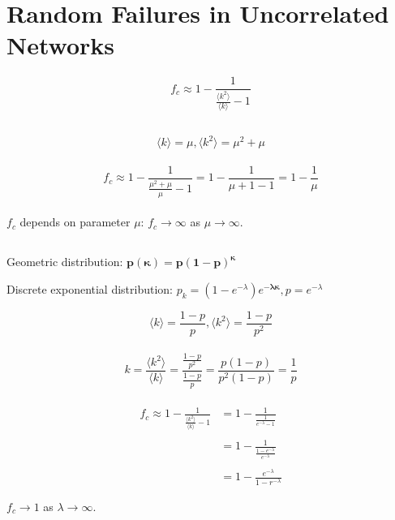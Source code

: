 \documentclass[../document.tex]{subfiles}
\begin{document}
\section{Random Failures in Uncorrelated Networks}

$$ f_c \approx 1 - \frac{ 1 }{ \frac{ \langle k^2 \rangle }{ \langle k \rangle } - 1 } $$

\subsection{}

$$ \langle k \rangle = \mu, \langle k^2 \rangle = \mu^2 + \mu $$ \\

$$ f_c \approx 1 - \frac{ 1 }{ \frac{ \mu^2 + \mu }{ \mu } - 1 } = 1 - \frac{ 1 }{ \mu + 1 - 1} = 1 - \frac{ 1 }{ \mu } $$ \\

$ f_c $ depends on parameter $ \mu $: $ f_c \to \infty $ as $ \mu \to \infty $.

\subsection{}

Geometric distribution: $ \mathbf{p(\kappa) = p(1-p)^\kappa} $

Discrete exponential distribution: $ p_k = (1 - e^{ -\lambda }) e^{ \mathbf{- \lambda \kappa} }, p = e^{ -\lambda } $

$$ \langle k \rangle = \frac{ 1-p }{ p }, \langle k^2 \rangle = \frac{ 1-p }{ p^2 } $$ \\

$$ k = \frac{ \langle k^2 \rangle }{ \langle k \rangle } = \frac{ \frac{ 1-p }{ p^2 } }{ \frac{ 1-p }{ p } } = \frac{ p(1-p) }{ p^2(1-p) } = \frac{1}{p} $$ \\

\begin{align*}
f_c \approx 1 - \frac{ 1 }{ \frac{ \langle k^2 \rangle }{ \langle k \rangle } - 1 } &= 1 - \frac{1}{ \frac{ 1 }{ e^{ -\lambda } - 1} } \\ \\
&= 1 - \frac{ 1 }{ \frac{ 1 - e^{ -\lambda } }{ e^{ -\lambda } } } \\ \\
&= 1 - \frac{ e^{ -\lambda } }{ 1 - r^{ -\lambda } }
\end{align*}

$ f_c \to 1 $ as $ \lambda \to \infty $.
\end{document}
